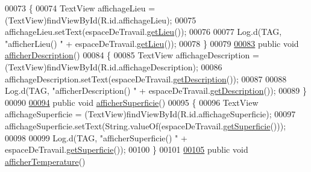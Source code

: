 \begin{DoxyCode}
00073     \{
00074         TextView affichageLieu = (TextView)findViewById(R.id.affichageLieu);
00075         affichageLieu.setText(espaceDeTravail.\hyperlink{classcom_1_1lasalle_1_1meeting_1_1_espace_de_travail_af320aa4ad7711ed52b3b5aef1bd52dd1}{getLieu}());
00076 
00077         Log.d(TAG, \textcolor{stringliteral}{"afficherLieu() "} + espaceDeTravail.\hyperlink{classcom_1_1lasalle_1_1meeting_1_1_espace_de_travail_af320aa4ad7711ed52b3b5aef1bd52dd1}{getLieu}());
00078     \}
00079 
\hyperlink{classcom_1_1lasalle_1_1meeting_1_1_affichage_espace_de_travail_a4afb30e3faf37f738f6261fc0696d62b}{00083}     \textcolor{keyword}{public} \textcolor{keywordtype}{void} \hyperlink{classcom_1_1lasalle_1_1meeting_1_1_affichage_espace_de_travail_a4afb30e3faf37f738f6261fc0696d62b}{afficherDescription}()
00084     \{
00085         TextView affichageDescription = (TextView)findViewById(R.id.affichageDescription);
00086         affichageDescription.setText(espaceDeTravail.\hyperlink{classcom_1_1lasalle_1_1meeting_1_1_espace_de_travail_a815ecee3f01117f2d9b1d9441b214907}{getDescription}());
00087 
00088         Log.d(TAG, \textcolor{stringliteral}{"afficherDescription() "} + espaceDeTravail.\hyperlink{classcom_1_1lasalle_1_1meeting_1_1_espace_de_travail_a815ecee3f01117f2d9b1d9441b214907}{getDescription}());
00089     \}
00090 
\hyperlink{classcom_1_1lasalle_1_1meeting_1_1_affichage_espace_de_travail_ae8f1d5cb6d99aced1996b1b2bbcebe26}{00094}     \textcolor{keyword}{public} \textcolor{keywordtype}{void} \hyperlink{classcom_1_1lasalle_1_1meeting_1_1_affichage_espace_de_travail_ae8f1d5cb6d99aced1996b1b2bbcebe26}{afficherSuperficie}()
00095     \{
00096         TextView affichageSuperficie = (TextView)findViewById(R.id.affichageSuperficie);
00097         affichageSuperficie.setText(String.valueOf(espaceDeTravail.\hyperlink{classcom_1_1lasalle_1_1meeting_1_1_espace_de_travail_ae2c734da9d454b368ddb056b1cdae499}{getSuperficie}()));
00098 
00099         Log.d(TAG, \textcolor{stringliteral}{"afficherSuperficie() "} + espaceDeTravail.\hyperlink{classcom_1_1lasalle_1_1meeting_1_1_espace_de_travail_ae2c734da9d454b368ddb056b1cdae499}{getSuperficie}());
00100     \}
00101 
\hyperlink{classcom_1_1lasalle_1_1meeting_1_1_affichage_espace_de_travail_a9474bdc380c78e632cc8d384d7393f50}{00105}     \textcolor{keyword}{public} \textcolor{keywordtype}{void} \hyperlink{classcom_1_1lasalle_1_1meeting_1_1_affichage_espace_de_travail_a9474bdc380c78e632cc8d384d7393f50}{afficherTemperature}()

\end{DoxyCode}
